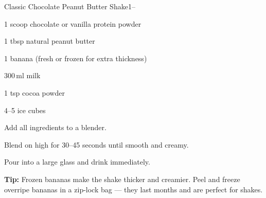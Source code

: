 \begin{recipebox}{Classic Chocolate Peanut Butter Shake}{1}{--}
\begin{ingredients}
  \item 1 scoop chocolate or vanilla protein powder
  \item 1 tbsp natural peanut butter
  \item 1 banana (fresh or frozen for extra thickness)
  \item 300\,ml milk
  \item 1 tsp cocoa powder
  \item 4--5 ice cubes
\end{ingredients}

\begin{method}
  \item Add all ingredients to a blender.
  \item Blend on high for 30--45 seconds until smooth and creamy.
  \item Pour into a large glass and drink immediately.
\end{method}

\begin{notelist}
  \item \textbf{Tip:} Frozen bananas make the shake thicker and creamier. Peel and freeze overripe bananas in a zip-lock bag --- they last months and are perfect for shakes.
\end{notelist}
\end{recipebox}
